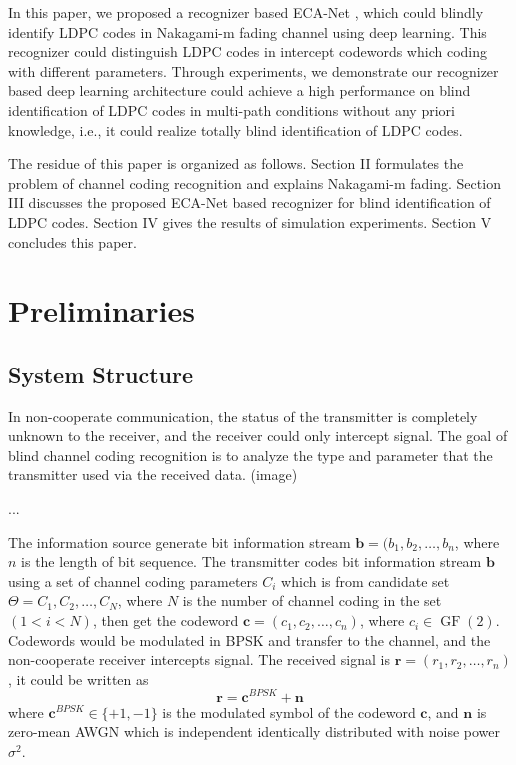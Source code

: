 \documentclass[conference]{IEEEtran}
\begin{document}
In this paper, we proposed a recognizer based ECA-Net \cite{2020ECA}, which could blindly identify LDPC codes in Nakagami-m fading \cite{le2020wireless} channel using deep learning. This recognizer could distinguish LDPC codes in intercept codewords which coding with different parameters. Through experiments, we demonstrate our recognizer based deep learning architecture could achieve a high performance on blind identification of LDPC codes in multi-path conditions without any priori knowledge, i.e., it could realize totally blind identification of LDPC codes.

The residue of this paper is organized as follows. Section II formulates the problem of channel coding recognition and explains Nakagami-m fading. Section III discusses the proposed ECA-Net based recognizer for blind identification of LDPC codes. Section IV gives the results of simulation experiments. Section V concludes this paper.


\section{Preliminaries}

\subsection{System Structure}
In non-cooperate communication, the status of the transmitter is completely unknown to the receiver, and the receiver could only intercept signal. The goal of blind channel coding recognition is to analyze the type and parameter that the transmitter used via the received data. (image)

...

The information source generate bit information stream $\boldsymbol{b} = ({b}_{1}, {b}_{2}, \ldots, {b}_{n}$, where $n$ is the length of bit sequence. The transmitter codes bit information stream $\boldsymbol{b}$ using a set of channel coding parameters $C_i$ which is from candidate set $\Theta={C_{1}, C_{2}, \ldots, C_{N}}$, where $N$ is the number of channel coding in the set $(1 < i < N)$, then get  the codeword $\boldsymbol{c}=({c}_{1}, {c}_{2}, \ldots, {c}_{n})$, where $c_{i} \in \operatorname{GF}(2)$. Codewords would be modulated in BPSK and transfer to the channel, and the non-cooperate receiver intercepts signal. The received signal is $\boldsymbol{r} = (r_{1}, r_{2}, \ldots, r_{n})$, it could be written as
\begin{equation}
	\boldsymbol{r} = \boldsymbol{c}^{BPSK}+\boldsymbol{n}
\end{equation}
where $\boldsymbol{c}^{BPSK} \in \{+1,-1\}$ is the modulated symbol of the codeword $\boldsymbol{c}$, and $\boldsymbol{n}$ is zero-mean AWGN which is independent identically distributed with noise power $\sigma^{2}$.
\end{document}
